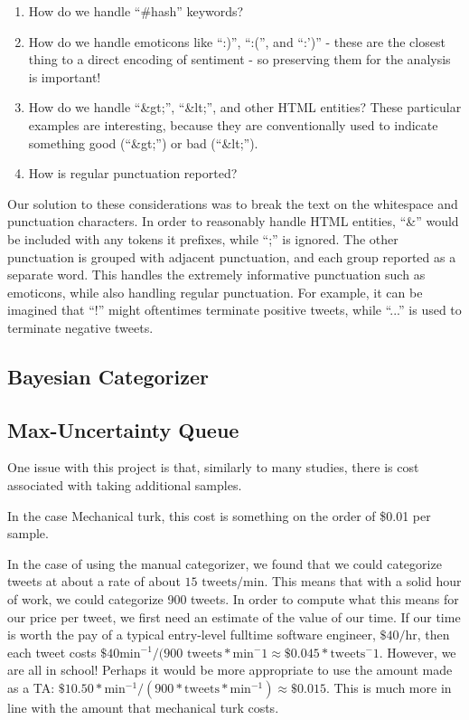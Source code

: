 \documentclass[12pt,a4paper]{article}
\begin{document}
\begin{enumerate}[1)]
\item How do we handle ``\#hash'' keywords?
\item How do we handle emoticons like ``:)'', ``:('', and ``:')'' - these are the closest thing to a direct encoding of sentiment - so preserving them for the analysis is important!
\item How do we handle ``\&gt;'', ``\&lt;'', and other HTML entities?  These particular examples are interesting, because they are conventionally used to indicate something good (``\&gt;'') or bad (``\&lt;'').
\item How is regular punctuation reported?
\end{enumerate}

Our solution to these considerations was to break the text on the whitespace and punctuation characters.  In order to reasonably handle HTML entities, ``\&'' would be included with any tokens it prefixes, while ``;'' is ignored.  The other punctuation is grouped with adjacent punctuation, and each group reported as a separate word.  This handles the extremely informative punctuation such as emoticons, while also handling regular punctuation.  For example, it can be imagined that ``!'' might oftentimes terminate positive tweets, while ``...'' is used to terminate negative tweets.

\subsection { Bayesian Categorizer }

\subsection { Max-Uncertainty Queue }

One issue with this project is that, similarly to many studies, there is cost associated with taking additional samples.

In the case Mechanical turk, this cost is something on the order of \$0.01 per sample. %


In the case of using the manual categorizer, we found that we could categorize tweets at about a rate of about $ 15 \text{ tweets} / \text{min} $.  This means that with a solid hour of work, we could categorize 900 tweets.  In order to compute what this means for our price per tweet, we first need an estimate of the value of our time.  If our time is worth the pay of a typical entry-level fulltime software engineer, $ \$40 / \text{hr} $, then each tweet costs $ \$40 \text{min}^{-1} / ( 900 \text{ tweets} * \text{min}^-1 \approx \$0.045 * \text{tweets}^-1 $.  However, we are all in school!  Perhaps it would be more appropriate to use the amount made as a TA: $ \$10.50 * \text{min}^{-1} / ( 900 * \text{tweets} * \text{min}^{-1} ) \approx \$0.015 $.  This is much more in line with the amount that mechanical turk costs.
\end{document}
